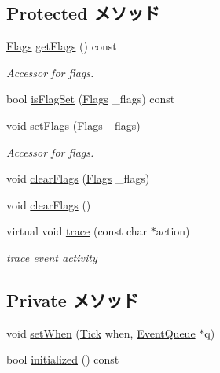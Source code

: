 \subsection*{Protected メソッド}
\begin{DoxyCompactItemize}
\item 
\hyperlink{classFlags}{Flags} \hyperlink{classEvent_acb0e52e5c94b8d10cbd9418ec342e01f}{getFlags} () const 
\begin{DoxyCompactList}\small\item\em Accessor for flags. \item\end{DoxyCompactList}\item 
bool \hyperlink{classEvent_ac51cd4574b80bff5304e33fbc28db177}{isFlagSet} (\hyperlink{classFlags}{Flags} \_\-flags) const 
\item 
void \hyperlink{classEvent_a5e0b0810720dd9a6badbf966c410f723}{setFlags} (\hyperlink{classFlags}{Flags} \_\-flags)
\begin{DoxyCompactList}\small\item\em Accessor for flags. \item\end{DoxyCompactList}\item 
void \hyperlink{classEvent_a3d05c8ddda9348a05704f89a90bb6169}{clearFlags} (\hyperlink{classFlags}{Flags} \_\-flags)
\item 
void \hyperlink{classEvent_a97d5bfe661fa4e01c6895533d668d2d1}{clearFlags} ()
\item 
virtual void \hyperlink{classEvent_ac7983455be765710922308f521703584}{trace} (const char $\ast$action)
\begin{DoxyCompactList}\small\item\em trace event activity \item\end{DoxyCompactList}\end{DoxyCompactItemize}
\subsection*{Private メソッド}
\begin{DoxyCompactItemize}
\item 
void \hyperlink{classEvent_a55b61692e3efd22af1598cb1c721d70b}{setWhen} (\hyperlink{base_2types_8hh_a5c8ed81b7d238c9083e1037ba6d61643}{Tick} when, \hyperlink{classEventQueue}{EventQueue} $\ast$q)
\item 
bool \hyperlink{classEvent_aa2a7557ebf105cff8a91f2af1511adf0}{initialized} () const 
\end{DoxyCompactItemize}
